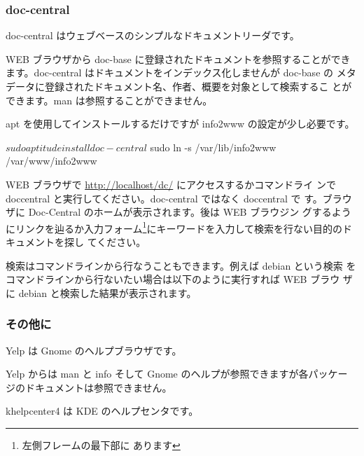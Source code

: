 \documentclass[mingoth,a4paper]{jsarticle}
\begin{document}
\subsubsection{doc-central}

doc-central はウェブベースのシンプルなドキュメントリーダです。

WEB ブラウザから doc-base に登録されたドキュメントを参照することができ
ます。doc-central はドキュメントをインデックス化しませんが doc-base の
メタデータに登録されたドキュメント名、作者、概要を対象として検索するこ
とができます。man は参照することができません。


apt を使用してインストールするだけですが info2www の設定が少し必要です。

\begin{commandline}
  $ sudo aptitude install doc-central
  $ sudo ln -s /var/lib/info2www /var/www/info2www
\end{commandline}


WEB ブラウザで \url{http://localhost/dc/} にアクセスするかコマンドライ
ンで doccentral と実行してください。doc-central ではなく doccentral で
す。ブラウザに Doc-Central のホームが表示されます。後は WEB ブラウジン
グするようにリンクを辿るか入力フォーム\footnote{左側フレームの最下部に
  あります}にキーワードを入力して検索を行ない目的のドキュメントを探し
てください。

検索はコマンドラインから行なうこともできます。例えば debian という検索
をコマンドラインから行ないたい場合は以下のように実行すれば WEB ブラウ
ザに debian と検索した結果が表示されます。



\subsubsection{その他に}


Yelp は Gnome のヘルプブラウザです。

Yelp からは man と info そして Gnome のヘルプが参照できますが各パッケー
ジのドキュメントは参照できません。


khelpcenter4 は KDE のヘルプセンタです。
\end{document}
